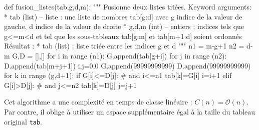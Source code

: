 \documentclass[10pt,fleqn]{article} %
\begin{document}
\begin{minipage}[c]{.48\linewidth}
\begin{py}
\begin{python}
def fusion_listes(tab,g,d,m):
    """
    Fusionne deux listes triées.
    Keyword arguments:
     * tab (list) -- liste : une liste de nombres 
        tab[g:d] avec g indice de la valeur de 
        gauche, d indice de la valeur de droite
     * g,d,m (int) -- entiers : indices tels que 
        g<=m<d et tel que les sous-tableaux
        tab[g:m] et tab[m+1:d] soient ordonnés
    Résultat :
     * tab (list) : liste triée entre les indices 
       g et d
    """
    n1 = m-g+1
    n2 = d-m
    G,D = [],[]
    for i in range (n1):
        G.append(tab[g+i])
    for j in range (n2):
        D.append(tab[m+j+1])
    i,j=0,0
    G.append(99999999999)
    D.append(99999999999)
    for k in range (g,d+1):
        if G[i]<=D[j]: # and i<=n1 
            tab[k]=G[i]
            i=i+1
        elif G[i]>D[j]: # and j<=n2
            tab[k]=D[j]
            j=j+1
\end{python}
\end{py}
\end{minipage} 

\begin{resultat}
Cet algorithme a une complexité en temps de classe linéaire : $C(n)=\mathcal{O}(n)$.
Par contre, il oblige à utiliser un espace supplémentaire égal à la taille du tableau original \texttt{tab}.
\end{resultat}
\end{document}
